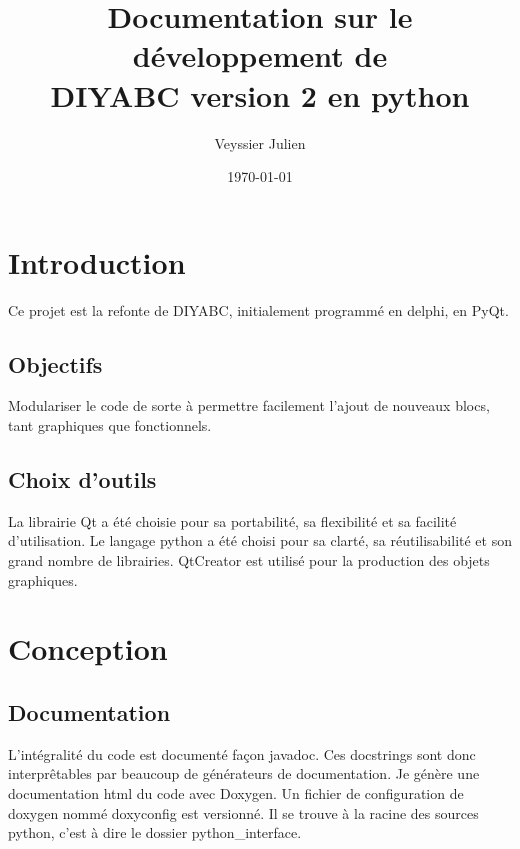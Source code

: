 \documentclass[12pt,a4paper]{article}
\author{Veyssier Julien}
\title{Documentation sur le développement de \\
DIYABC version 2 en python}
\date\today
\begin{document}
\maketitle
\newpage

\tableofcontents

\newpage
 

\section{Introduction}
Ce projet est la refonte de DIYABC, initialement programmé en delphi, en PyQt.
	\subsection{Objectifs}
        Modulariser le code de sorte à permettre facilement l'ajout de nouveaux
        blocs, tant graphiques que fonctionnels.

	\subsection{Choix d'outils}
        La librairie Qt a été choisie pour sa portabilité, sa flexibilité et sa
        facilité d'utilisation. Le langage python a été choisi pour sa clarté,
        sa réutilisabilité et son grand nombre de librairies. QtCreator est
        utilis\'e pour la production des objets graphiques.

\section{Conception}
    
    \subsection{Documentation}
    L'intégralité du code est documenté façon javadoc. Ces docstrings sont donc
    interprêtables par beaucoup de générateurs de documentation.  Je génère une
    documentation html du code avec Doxygen. Un fichier de configuration de
    doxygen nommé doxyconfig est versionné. Il se trouve à la racine des sources
    python, c'est à dire le dossier python\_interface.\\
\end{document}
